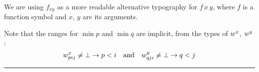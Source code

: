 \medskip
We are using $f_{xy}$
as a more readable alternative typography for $f\,x\,y$,
where $f$ is a function symbol and $x$, $y$ are its arguments.

Note that the ranges for $\min p$ and $\min q$ are implicit, from the types of
$w^x_{}$, $w^y_{}$: \[w^x_{pij}\neq\bot\rightarrow p<i \quad \mbox{and} \quad w^y_{qji}\neq\bot\rightarrow q<j\]

\medskip
\hrule
